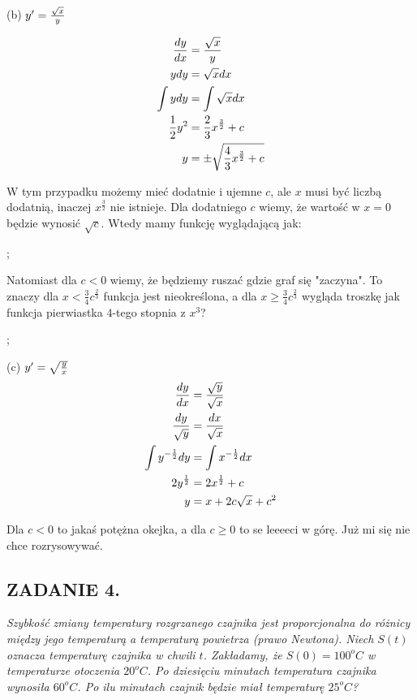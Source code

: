 \documentclass{article}
\begin{document}
{\color{dark-green}(b) $y'={\sqrt{x}\over y}$}

\begin{align*}
    {dy\over dx}&={\sqrt{x}\over y}\\
    ydy&=\sqrt{x}dx\\
    \int ydy&=\int\sqrt{x}dx\\
    \frac12y^2&=\frac23x^{\frac32}+c\\
    y&=\pm\sqrt{\frac43x^{\frac32}+c}
\end{align*}

W tym przypadku możemy mieć dodatnie i ujemne $c$, ale $x$ musi być liczbą dodatnią, inaczej $x^{\frac32}$ nie istnieje. Dla dodatniego $c$ wiemy, że wartość w $x=0$ będzie wynosić $\sqrt{c}$. Wtedy mamy funkcję wyglądającą jak:
\begin{illustration}
    \begin{my-axis}
        ;
    \end{my-axis}
\end{illustration}

Natomiast dla $c<0$ wiemy, że będziemy ruszać gdzie graf się "zaczyna". To znaczy dla $x<\frac34c^{\frac23}$ funkcja jest nieokreślona, a dla $x\geq \frac34c^{\frac23}$ wygląda troszkę jak funkcja pierwiastka $4$-tego stopnia z $x^3$?
\begin{illustration}
    \begin{my-axis}
        ;
    \end{my-axis}
\end{illustration}

{\color{dark-green}(c) $y'=\sqrt{{y\over x}}$}
\begin{align*}
    {dy\over dx}&={\sqrt{y}\over\sqrt{x}}\\
    {dy\over \sqrt{y}}&={dx\over\sqrt{x}}\\
    \int y^{-\frac12}dy&=\int x^{-\frac12}dx\\
    2y^{\frac12}&=2x^\frac12+c\\
    y&=x+2c\sqrt{x}+c^2
\end{align*}

Dla $c<0$ to jakaś potężna okejka, a dla $c\geq 0$ to se leeeeci w górę. Już mi się nie chce rozrysowywać.

\subsection*{ZADANIE 4.}
\emph{Szybkość zmiany temperatury rozgrzanego czajnika jest proporcjonalna do różnicy między jego temperaturą a temperaturą powietrza (prawo Newtona). Niech $S(t)$ oznacza temperaturę czajnika w chwili $t$. Zakładamy, że $S(0)=100^oC$ w temperaturze otoczenia $20^oC$. Po dziesięciu minutach temperatura czajnika wynosiła $60^oC$. Po ilu minutach czajnik będzie miał temperaturę $25^oC$?}
\end{document}
